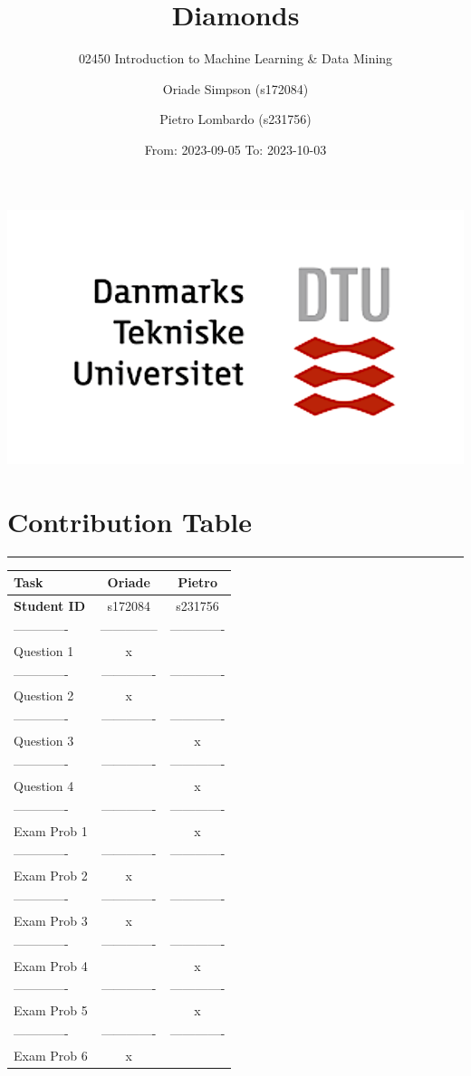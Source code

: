 \documentclass[
]{article}
\title{Diamonds}
\subtitle{02450 Introduction to Machine Learning \& Data Mining}
\author{Oriade Simpson (s172084) \and Pietro Lombardo (s231756)}
\date{From: 2023-09-05 To: 2023-10-03}
\begin{document}
\maketitle

\begin{center}\includegraphics[width=0.4\linewidth]{Images/Universe2} \end{center}

\newpage

\hypertarget{contribution-table}{%
\section{Contribution Table}\label{contribution-table}}

\begin{center}\rule{0.5\linewidth}{0.5pt}\end{center}

\begin{longtable}[]{@{}lcc@{}}
\toprule\noalign{}
Task & Oriade & Pietro \\
\midrule\noalign{}
\endhead
\bottomrule\noalign{}
\endlastfoot
\textbf{Student ID} & s172084 & s231756 \\
------------- & -------------- & ------------- \\
Question 1 & x & \\
------------- & ------------- & ------------- \\
Question 2 & x & \\
------------- & ------------- & ------------- \\
Question 3 & & x \\
------------- & ------------- & ------------- \\
Question 4 & & x \\
------------- & ------------- & ------------- \\
Exam Prob 1 & & x \\
------------- & ------------- & ------------- \\
Exam Prob 2 & x & \\
------------- & ------------- & ------------- \\
Exam Prob 3 & x & \\
------------- & ------------- & ------------- \\
Exam Prob 4 & & x \\
------------- & ------------- & ------------- \\
Exam Prob 5 & & x \\
------------- & ------------- & ------------- \\
Exam Prob 6 & x & \\
\end{longtable}
\end{document}
